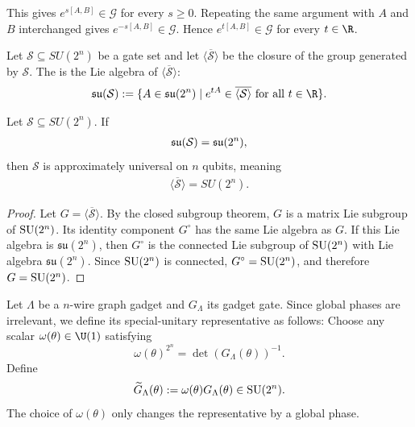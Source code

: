 This gives \(e^{s[A,B]}\in\mathcal G\) for every \(s\ge0\). Repeating the same
argument with \(A\) and \(B\) interchanged gives \(e^{-s[A,B]}\in\mathcal G\).
Hence \(e^{t[A,B]}\in\mathcal G\) for every \(t\in\R\).

\begin{definition}
\label{def:lie-algebra-generated-by-gates}
Let $\mathcal{S} \subseteq SU(2^n)$ be a gate set and let $\overline{\langle \mathcal{S}\rangle}$ be the closure of the group generated by $\mathcal{S}$. The  is the Lie algebra of $\overline{\langle \mathcal{S}\rangle}$:
\begin{align}
    \Lie(\mathcal{S})
    :=
    \{ A \in \mathfrak{su}(2^n)
    \mid
    e^{tA} \in \overline{\langle \mathcal{S}\rangle}
    \text{ for all } t \in \R
    \}.
\end{align}
\end{definition}

\begin{theorem}
\label{thm:lie-algebra-universality}
Let $\mathcal{S} \subseteq SU(2^n)$. If
\begin{align}
    \mathfrak{su}(\mathcal{S})
    =
    \mathfrak{su}(2^n),
\end{align}
then $\mathcal{S}$ is approximately universal on $n$ qubits, meaning
\begin{align}
    \overline{\langle \mathcal{S}\rangle}
    =
    SU(2^n).
\end{align}
\end{theorem}

\begin{proof}
Let \(G=\overline{\langle\mathcal S\rangle}\). By the closed subgroup theorem,
\(G\) is a matrix Lie subgroup of \(\operatorname{SU}(2^n)\). Its identity component \(G^\circ\)
has the same Lie algebra as \(G\). If this Lie algebra is
\(\mathfrak{su}(2^n)\), then \(G^\circ\) is the connected Lie subgroup of
\(\operatorname{SU}(2^n)\) with Lie algebra \(\mathfrak{su}(2^n)\). Since \(\operatorname{SU}(2^n)\) is
connected, \(G^\circ=\operatorname{SU}(2^n)\), and therefore \(G=\operatorname{SU}(2^n)\).
\end{proof}

\begin{definition}
\label{def:special-unitary-gadget}
Let $\Lambda$ be a $n$-wire graph gadget and $G_\Lambda$ its gadget gate. Since global phases are irrelevant, we define its special-unitary representative as follows: 
Choose any scalar \(\omega(\theta)\in\U(1)\) satisfying
\[
    \omega(\theta)^{2^n}=\det(G_\Lambda(\theta))^{-1}.
\]
Define
\[
    \widetilde G_\Lambda(\theta):=\omega(\theta)G_\Lambda(\theta)\in\operatorname{SU}(2^n).
\]
The choice of \(\omega(\theta)\) only changes the representative by a global
phase.
\end{definition}

